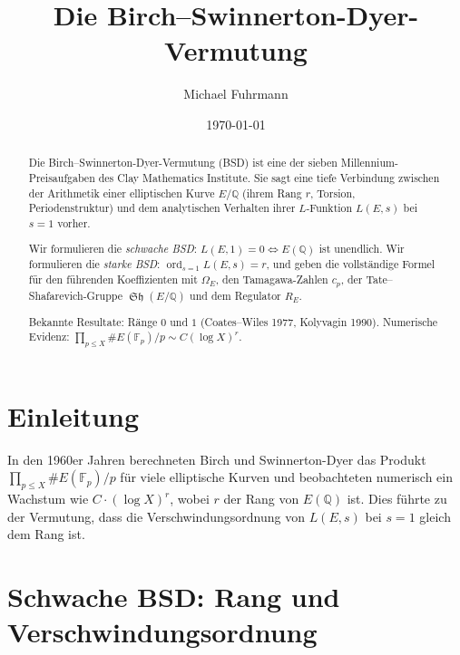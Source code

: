 \documentclass[12pt,a4paper]{amsart}
\theoremstyle{definition}
\newcommand{\Q}{\mathbb{Q}}
\newcommand{\Fp}{\mathbb{F}_p}
\DeclareMathOperator{\ord}{ord}
\DeclareMathOperator{\Sha}{\mathfrak{Sh}}
\begin{document}

\title{Die Birch--Swinnerton-Dyer-Vermutung}

\author{Michael Fuhrmann}
\address{Specialist Mathematics Project, Build 84}
\date{\today}

\begin{abstract}
Die Birch--Swinnerton-Dyer-Vermutung (BSD) ist eine der sieben
Millennium-Preisaufgaben des Clay Mathematics Institute.
Sie sagt eine tiefe Verbindung zwischen der Arithmetik einer elliptischen
Kurve $E/\Q$ (ihrem Rang $r$, Torsion, Periodenstruktur) und dem
analytischen Verhalten ihrer $L$-Funktion $L(E,s)$ bei $s=1$ vorher.

Wir formulieren die \emph{schwache BSD}: $L(E,1) = 0 \iff E(\Q)$ ist unendlich.
Wir formulieren die \emph{starke BSD}: $\ord_{s=1}L(E,s) = r$, und geben
die vollst\"andige Formel f\"ur den f\"uhrenden Koeffizienten mit $\Omega_E$,
den Tamagawa-Zahlen $c_p$, der Tate--Shafarevich-Gruppe $\Sha(E/\Q)$
und dem Regulator $R_E$.

Bekannte Resultate: R\"ange $0$ und $1$
(Coates--Wiles 1977, Kolyvagin 1990).
Numerische Evidenz: $\prod_{p \le X} \#E(\Fp)/p \sim C(\log X)^r$.
\end{abstract}

\maketitle
\tableofcontents

\section{Einleitung}

In den 1960er Jahren berechneten Birch und Swinnerton-Dyer \cite{BSD1965}
das Produkt $\prod_{p \le X} \#E(\Fp)/p$ f\"ur viele elliptische Kurven
und beobachteten numerisch ein Wachstum wie $C \cdot (\log X)^r$,
wobei $r$ der Rang von $E(\Q)$ ist.
Dies f\"uhrte zu der Vermutung, dass die Verschwindungsordnung von
$L(E,s)$ bei $s=1$ gleich dem Rang ist.

\section{Schwache BSD: Rang und Verschwindungsordnung}
\end{document}

